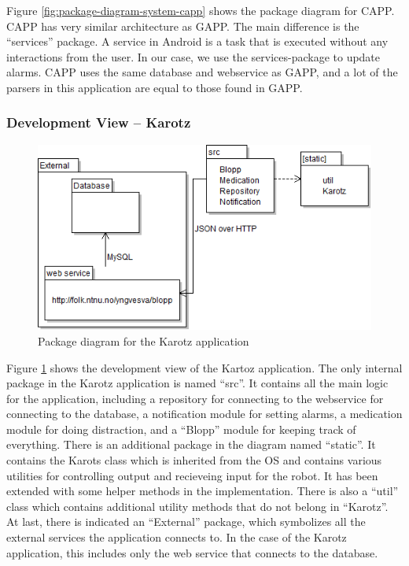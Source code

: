 Figure \ref {fig:package-diagram-system-capp} shows the package diagram for CAPP. CAPP has very similar architecture as GAPP.
The main difference is the ``services'' package. A service in Android is a task that is executed without any interactions from the user. In our case,
we use the services-package to update alarms. CAPP uses the same database and webservice as GAPP, and
a lot of the parsers in this application are equal to those found in GAPP.

\subsubsection{Development View -- Karotz}
 \begin{figure}
 	\centering
 		\includegraphics[width=12cm]{Pictures/ArchPictures/KarotzPackageDiagram}
	\caption[Karotz package diagram]{Package diagram for the Karotz application}
	\label{fig:package-diagram-system-karotz}
 \end{figure}

Figure \ref{fig:package-diagram-system-karotz} shows the development view of the Kartoz application. The only internal package in the Karotz application
is named ``src''. It contains all the main logic for the application, including a repository for connecting to the webservice for connecting to the
database, a notification module for setting alarms, a medication module for doing distraction, and a ``Blopp'' module for keeping track of everything.
There is an additional package in the diagram named ``\lbrack{}static\rbrack{}''. It contains the Karots class which is inherited from the OS and
contains various utilities for controlling output and recieveing input for the robot. It has been extended with some helper methods in the
implementation. There is also a ``util'' class which contains additional utility methods that do not belong in ``Karotz''. At last, there is indicated
an ``External'' package, which symbolizes all the external services the application connects to. In the case of the Karotz application, this includes
only the web service that connects to the database.